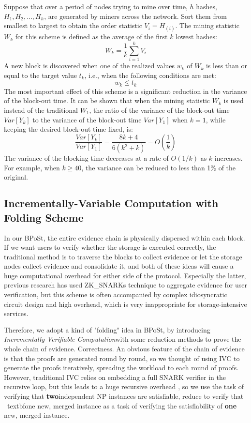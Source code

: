 \documentclass[journal]{IEEEtran}
\begin{document}
Suppose that over a period of nodes trying to mine over time, $h$ hashes, $H_1, H_2, \dots, H_h$, are generated by miners across the network. Sort them from smallest to largest to obtain the order statistic $V_i = H_{(i)}$. The mining statistic $W_k$ for this scheme is defined as the average of the first $k$ lowest hashes:
\begin{equation}
W_k = \frac{1}{k}\sum_{i=1}^{k}V_i
\end{equation}
A new block is discovered when one of the realized values $w_k$ of $W_k$ is less than or equal to the target value $t_k$, i.e., when the following conditions are met:
\begin{equation}
w_k \le t_k
\end{equation}
The most important effect of this scheme is a significant reduction in the variance of the block-out time. It can be shown that when the mining statistic $W_k$ is used instead of the traditional $W_1$, the ratio of the variance of the block-out time $Var[Y_k]$ to the variance of the block-out time $Var[Y_1]$ when $k=1$, while keeping the desired block-out time fixed, is:
\begin{equation}
\frac{Var[Y_k]}{Var[Y_1]} = \frac{8k+4}{6(k^2+k)} = O(\frac{1}{k})
\end{equation}
The variance of the blocking time decreases at a rate of $O(1/k)$ as $k$ increases. For example, when $k \ge 40$, the variance can be reduced to less than 1\% of the original.


\subsection{Incrementally-Variable Computation with Folding Scheme}
In our BPoSt, the entire evidence chain is physically dispersed within each block. If we want users to verify whether the storage is executed correctly, the traditional method is to traverse the blocks to collect evidence or let the storage nodes collect evidence and consolidate it, and both of these ideas will cause a huge computational overhead for either side of the protocol. Especially the latter, previous research has used ZK\_SNARKs\cite{2023epost, 2019pospacetime} technique to aggregate evidence for user verification, but this scheme is often accompanied by complex idiosyncratic circuit design and high overhead, which is very inappropriate for storage-intensive services.


Therefore, we adopt a kind of "folding"\cite{2022nova} idea in BPoSt, by introducing \textit{Incrementally Verifiable Computation}\cite{2008ivc}with some reduction methods to prove the whole chain of evidence. Correctness. An obvious feature of the chain of evidence is that the proofs are generated round by round, so we thought of using IVC to generate the proofs iteratively, spreading the workload to each round of proofs. However, traditional IVC relies on embedding a full SNARK verifier in the recursive loop, but this leads to a huge recursive overhead \cite{2020proof, 2021proofs}, so we use the task of verifying that \textbf{two}independent NP instances are satisfiable, reduce to verify that \ textbf{one} new, merged instance as a task of verifying the satisfiability of \textbf{one} new, merged instance\cite{2022nova}. 
\end{document}
